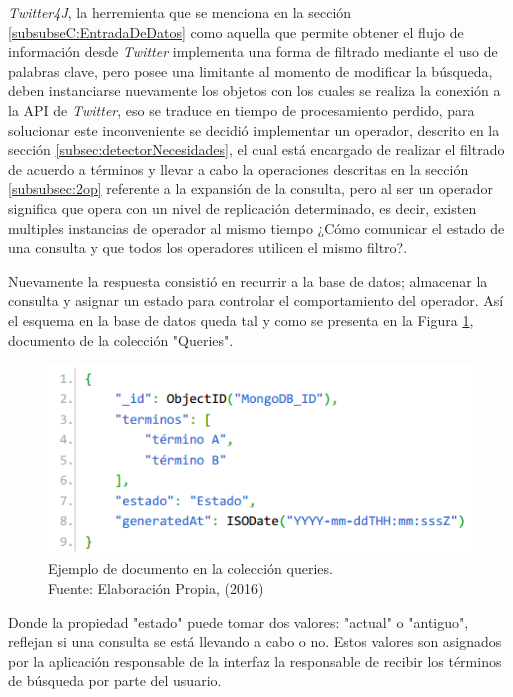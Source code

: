 \textit{Twitter4J}, la herremienta que se menciona en la sección \ref{subsubseC:EntradaDeDatos} como aquella que permite obtener el flujo de información desde \textit{Twitter} implementa una forma de filtrado mediante el uso de palabras clave, pero posee una limitante al momento de modificar la búsqueda, deben instanciarse nuevamente los objetos con los cuales se realiza la conexión a la API de \textit{Twitter}, eso se traduce en tiempo de procesamiento perdido, para solucionar este inconveniente se decidió implementar un operador, descrito en la sección \ref{subsec:detectorNecesidades}, el cual está encargado de realizar el filtrado de acuerdo a términos y llevar a cabo la operaciones descritas en la sección \ref{subsubsec:2op} referente a la expansión de la consulta, pero al ser un operador significa que opera con un nivel de replicación determinado, es decir, existen multiples instancias de operador al mismo tiempo ¿Cómo comunicar el estado de una consulta y que todos los operadores utilicen el mismo filtro?.

Nuevamente la respuesta consistió en recurrir a la base de datos; almacenar la consulta y asignar un estado para controlar el comportamiento del operador. Así el esquema en la base de datos queda tal y como se presenta en la Figura \ref{fig:esquemaQuery}, documento de la colección "Queries".

\begin{figure}[H]
	\centering
	\captionsetup{justification=centering}
	\includegraphics[scale=0.8]{images/Query.png}
	\caption[Ejemplo de documento en la colección queries.]{Ejemplo de documento en la colección queries.\\Fuente: Elaboración Propia, (2016)}
	\label{fig:esquemaQuery}
\end{figure}

Donde la propiedad "estado" puede tomar dos valores: "actual" o "antiguo", reflejan si una consulta se está llevando a cabo o no. Estos valores son asignados por la aplicación responsable de la interfaz la responsable de recibir los términos de búsqueda por parte del usuario.

